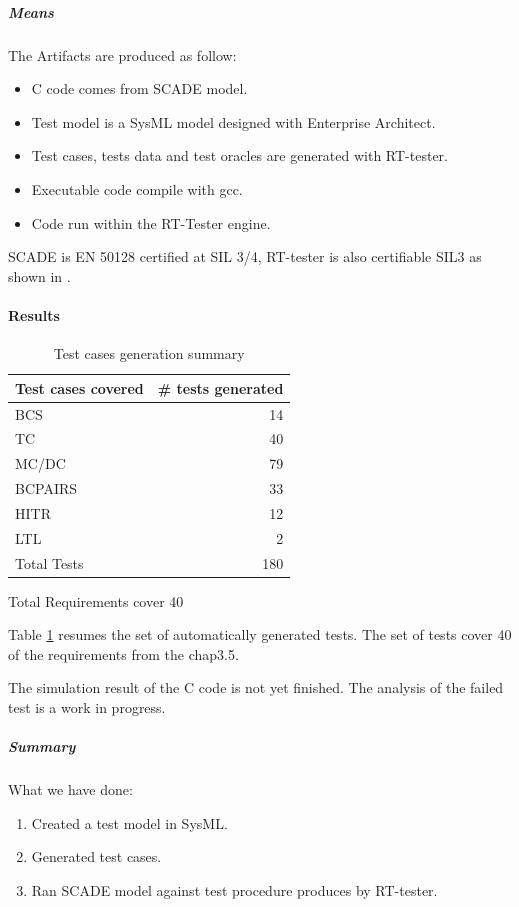 \documentclass{article}
\begin{document}
\subparagraph{Means}

The Artifacts are produced as follow:
\begin{itemize}
\item C code comes from SCADE model.
\item Test model is a SysML model designed with Enterprise Architect.
\item Test cases, tests data and test oracles are generated with RT-tester.
\item Executable code compile with gcc.
\item Code run within the RT-Tester engine.
\end{itemize}

SCADE is EN 50128 certified at SIL 3/4, RT-tester is also certifiable
SIL3 as shown in \cite{peleska_efficient_2012}.

\paragraph{Results}

\begin{table}[htbp]
\centering
\begin{tabular}{lr}\toprule
  Test cases covered & \# tests generated  \\\midrule
  BCS & 14 \\
  TC & 40 \\
  MC/DC & 79 \\
  BCPAIRS & 33\\
  HITR & 12 \\
  LTL & 2 \\ \midrule
  Total Tests& 180\\\bottomrule
\end{tabular}

\vspace{1em}
\raggedleft Total Requirements cover 40
\caption{\label{tbl:test_summary} Test cases generation summary}
\end{table}

Table \ref{tbl:test_summary} resumes the set of automatically
generated tests.
The set of tests cover 40 of the requirements from the chap3.5.

The simulation result of the C code is not yet finished. The analysis
of the failed test is a work in progress.


\subparagraph{Summary}

What we have done:
\begin{enumerate}
\item Created a test model in SysML.
\item Generated test cases.
\item Ran SCADE model against test procedure produces by RT-tester.
\end{enumerate}
 
\end{document}
